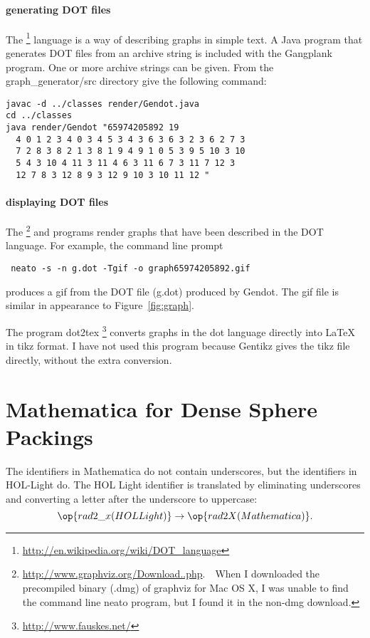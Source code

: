 \subsubsection{generating DOT files}

The %
\footnote{\url{http://en.wikipedia.org/wiki/DOT_language}} %
 language is a way of describing graphs in simple text.
A Java program that generates DOT files from an archive string is included
with the Gangplank program.  One or more archive strings can be given.
From the graph\_generator/src
directory give the following command:

\begin{verbatim}
javac -d ../classes render/Gendot.java 
cd ../classes
java render/Gendot "65974205892 19 
  4 0 1 2 3 4 0 3 4 5 3 4 3 6 3 6 3 2 3 6 2 7 3 
  7 2 8 3 8 2 1 3 8 1 9 4 9 1 0 5 3 9 5 10 3 10 
  5 4 3 10 4 11 3 11 4 6 3 11 6 7 3 11 7 12 3 
  12 7 8 3 12 8 9 3 12 9 10 3 10 11 12 "
\end{verbatim}


\subsubsection{displaying DOT files}


The %
\footnote{\url{http://www.graphviz.org/Download..php}.\ \    When I downloaded the precompiled binary (.dmg) of graphviz for Mac OS X, I was unable to find the command line neato program, but I found it in the non-dmg download.} %
and  programs render graphs that have been described in the DOT language.
For example,  the command line prompt
%
\begin{verbatim}
 neato -s -n g.dot -Tgif -o graph65974205892.gif
\end{verbatim}
%
produces a gif from the DOT file (g.dot) produced by Gendot.  The gif file is
similar in  appearance
to Figure~\ref{fig:graph}.


The program dot2tex%
\footnote{\url{http://www.fauskes.net/}} %
converts graphs in the dot language directly into
LaTeX in tikz format.  I have not used this program because Gentikz gives
the tikz file directly, without the extra conversion.




\chapter{Mathematica for Dense Sphere Packings}

The identifiers in Mathematica do not contain underscores, but the identifiers in HOL-Light do.
The HOL Light identifier is translated by eliminating underscores and converting a letter after the underscore to uppercase:
\[
\op{rad2\_x (HOL Light)} \to \op{rad2X (Mathematica)}.
\]


